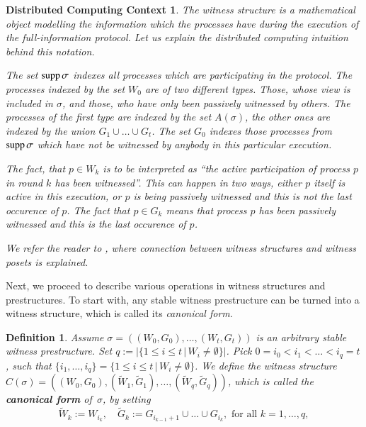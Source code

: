 \documentclass{amsart}[10pt]
\newtheorem{df}[theorem]{Definition}
\newtheorem{dcc}[theorem]{Distributed Computing Context}
\newcommand{\supp}{\text{\rm supp}\,}
\newcommand{\wti}{\widetilde}
\newcommand{\ab}{\allowbreak}
\numberwithin{equation}{section}
\numberwithin{figure}{section}
\numberwithin{table}{section}
\begin{document}
\begin{dcc}
The witness structure is a mathematical object modelling the
information which the processes have during the execution of the
full-information protocol. Let us explain the distributed computing
intuition behind this notation.

The set $\supp\sigma$ indexes all processes which are participating in
the protocol. The processes indexed by the set $W_0$ are of two
different types.  Those, whose view is included in $\sigma$, and
those, who have only been passively witnessed by others. The processes
of the first type are indexed by the set $A(\sigma)$, the other ones
are indexed by the union $G_1\cup\dots\cup G_t$. The set $G_0$ indexes
those processes from $\supp\sigma$ which have not be witnessed by
anybody in this particular execution.

The fact, that $p\in W_k$ is to be interpreted as ``the active
participation of process $p$ in round $k$ has been witnessed''. This
can happen in two ways, either $p$ itself is active in this execution,
or $p$ is being passively witnessed and this is not the last occurence
of $p$. The fact that $p\in G_k$ means that process $p$ has been
passively witnessed and this is the last occurence of $p$. 

We refer the reader to \cite[Section 6]{k1}, where connection between
witness structures and witness posets is explained.
\end{dcc}

Next, we proceed to describe various operations in witness structures
and prestructures. To start with, any stable witness prestructure can
be turned into a witness structure, which is called its {\it canonical
  form}.

\begin{df}\label{df:cform}
Assume $\sigma=((W_0,G_0),\dots,(W_t,G_t))$ is an arbitrary stable
witness prestructure. Set $q:=|\{1\leq i\leq t\,|\,
W_i\neq\emptyset\}|$.  Pick $0=i_0<i_1<\dots<i_q=t$, such that
$\{i_1,\dots,i_q\}=\{1\leq i\leq t\,|\,W_i\neq\emptyset\}$.  We define
the witness structure $C(\sigma)=((W_0,G_0),\ab(\wti W_1, \wti
G_1),\allowbreak \dots,\ab(\wti W_q,\wti G_q))$, which is called the {\bf
  canonical form} of~$\sigma$, by setting
\begin{equation}\label{eq:canon}
\wti W_k:=W_{i_k},\quad 
\wti G_k:=G_{i_{k-1}+1}\cup\dots\cup G_{i_k},\text{ for all } k=1,\dots,q,
\end{equation}
\end{df}
\end{document}
